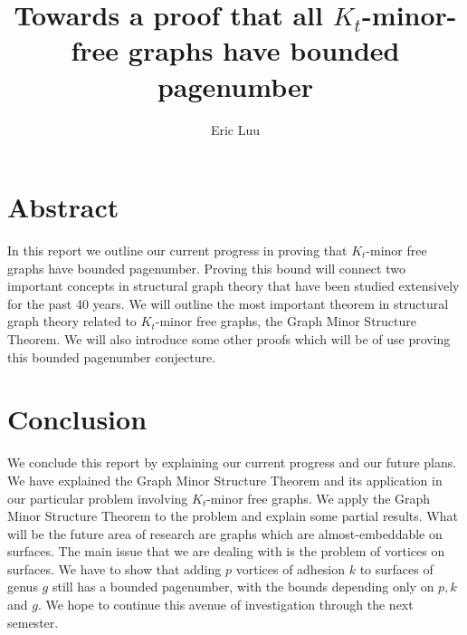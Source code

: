 \documentclass[]{report}
\title{Towards a proof that all $K_t$-minor-free graphs have bounded pagenumber}
\author{Eric Luu}
\theoremstyle{definition}
\numberwithin{theorem}{section}
\numberwithin{equation}{section}
\begin{document}
\maketitle
\listoftodos
\chapter{Abstract}\label{abstract}
In this report we outline our current progress in proving that $K_t$-minor free graphs have bounded pagenumber. Proving this bound will connect two important concepts in structural graph theory that have been studied extensively for the past 40 years. We will outline the most important theorem in structural graph theory related to $K_t$-minor free graphs, the Graph Minor Structure Theorem. We will also introduce some other proofs which will be of use proving this bounded pagenumber conjecture. 




	
	
	



\chapter{Conclusion}\label{chap:conclusion}
We conclude this report by explaining our current progress and our future plans. We have explained the Graph Minor Structure Theorem \cite{robertsonGraphMinorsXVI2003} and its application in our particular problem involving $K_t$-minor free graphs. We apply the Graph Minor Structure Theorem to the problem and explain some partial results. What will be the future area of research are graphs which are almost-embeddable on surfaces. The main issue that we are dealing with is the problem of vortices on surfaces. We have to show that adding $p$ vortices of adhesion $k$ to surfaces of genus $g$ still has a bounded pagenumber, with the bounds depending only on $p, k$ and $g$. We hope to continue this avenue of investigation through the next semester. 
\printbibliography
\end{document}
